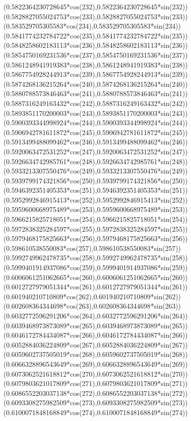 {({0.5822364230728645*cos(232)},{0.5822364230728645*sin(232)})
({0.5828827055024753*cos(233)},{0.5828827055024753*sin(233)})
({0.583529705305583*cos(234)},{0.583529705305583*sin(234)})
({0.5841774232784722*cos(235)},{0.5841774232784722*sin(235)})
({0.5848258602183113*cos(236)},{0.5848258602183113*sin(236)})
({0.5854750169231536*cos(237)},{0.5854750169231536*sin(237)})
({0.5861248941919383*cos(238)},{0.5861248941919383*sin(238)})
({0.5867754928244913*cos(239)},{0.5867754928244913*sin(239)})
({0.5874268136215264*cos(240)},{0.5874268136215264*sin(240)})
({0.5880788573846463*cos(241)},{0.5880788573846463*sin(241)})
({0.5887316249163432*cos(242)},{0.5887316249163432*sin(242)})
({0.5893851170200003*cos(243)},{0.5893851170200003*sin(243)})
({0.5900393344998924*cos(244)},{0.5900393344998924*sin(244)})
({0.5906942781611872*cos(245)},{0.5906942781611872*sin(245)})
({0.5913499488099462*cos(246)},{0.5913499488099462*sin(246)})
({0.5920063472531252*cos(247)},{0.5920063472531252*sin(247)})
({0.5926634742985761*cos(248)},{0.5926634742985761*sin(248)})
({0.5933213307550476*cos(249)},{0.5933213307550476*sin(249)})
({0.5939799174321856*cos(250)},{0.5939799174321856*sin(250)})
({0.5946392351405353*cos(251)},{0.5946392351405353*sin(251)})
({0.5952992846915413*cos(252)},{0.5952992846915413*sin(252)})
({0.5959600668975489*cos(253)},{0.5959600668975489*sin(253)})
({0.5966215825718051*cos(254)},{0.5966215825718051*sin(254)})
({0.5972838325284597*cos(255)},{0.5972838325284597*sin(255)})
({0.5979468175825663*cos(256)},{0.5979468175825663*sin(256)})
({0.598610538550083*cos(257)},{0.598610538550083*sin(257)})
({0.5992749962478735*cos(258)},{0.5992749962478735*sin(258)})
({0.5999401914937086*cos(259)},{0.5999401914937086*sin(259)})
({0.6006061251062665*cos(260)},{0.6006061251062665*sin(260)})
({0.6012727979051344*cos(261)},{0.6012727979051344*sin(261)})
({0.601940210710809*cos(262)},{0.601940210710809*sin(262)})
({0.602608364344698*cos(263)},{0.602608364344698*sin(263)})
({0.6032772596291206*cos(264)},{0.6032772596291206*sin(264)})
({0.6039468973873089*cos(265)},{0.6039468973873089*sin(265)})
({0.6046172784434087*cos(266)},{0.6046172784434087*sin(266)})
({0.6052884036224809*cos(267)},{0.6052884036224809*sin(267)})
({0.6059602737505019*cos(268)},{0.6059602737505019*sin(268)})
({0.6066328896543649*cos(269)},{0.6066328896543649*sin(269)})
({0.6073062521618812*cos(270)},{0.6073062521618812*sin(270)})
({0.6079803621017809*cos(271)},{0.6079803621017809*sin(271)})
({0.6086552203037138*cos(272)},{0.6086552203037138*sin(272)})
({0.6093308275982509*cos(273)},{0.6093308275982509*sin(273)})
({0.6100071848168849*cos(274)},{0.6100071848168849*sin(274)})
}
